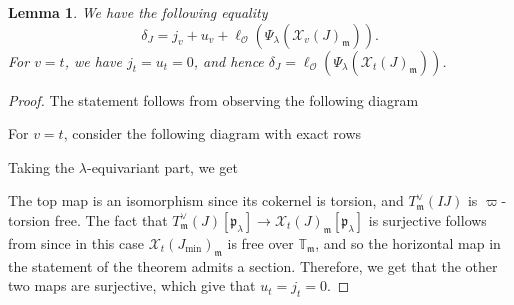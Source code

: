 \documentclass[a4paper, notitlepage, 10pt]{amsart}
\theoremstyle{plain} %
\newtheorem{lemma}[theorem]{Lemma}
\theoremstyle{definition} %
\theoremstyle{remark} %
\numberwithin{equation}{section}
\newcommand{\bbT}{\mathbb T}
\newcommand{\tf}{\operatorname{tf}} %
\begin{document}
\begin{lemma}\label{shdegtocongmodule}
    We have the following equality
    $$ \delta_J = j_v+u_v+ \ell_{\mathcal{O}}(\Psi_\lambda(\mathcal{X}_v(J)_{\mathfrak{m}})). $$
    For $v=t$, we have $j_t=u_t=0$, and hence $\delta_J =\ell_{\mathcal{O}}(\Psi_\lambda(\mathcal{X}_t(J)_{\mathfrak{m}}))$.
\end{lemma}
\begin{proof}
    The statement follows from observing the following diagram
\begin{center}
\end{center}
For $v=t$, consider the following diagram with exact rows
\begin{center} 
\end{center} 
Taking the $\lambda$-equivariant part, we get
\begin{center} \vspace{-6pt}
\end{center} \vspace{-6pt}
The top map is an isomorphism since its cokernel is torsion, and $T^\vee_{\mathfrak{m}}(IJ)$ is $\varpi$-torsion free. The fact that $T^\vee_{\mathfrak{m}}(J)[\mathfrak{p}_\lambda]\to \mathcal{X}_t(J)_{\mathfrak{m}}[\mathfrak{p}_\lambda]$ is surjective follows from  since in this case $\mathcal{X}_t(J_{\min})_{\mathfrak{m}}$ is free over $\bbT_{\mathfrak{m}}$, and so the horizontal map in the statement of the theorem admits a section. Therefore, we get that the other two maps are surjective, which give that $u_t=j_t=0$. 
\end{proof}
\end{document}
